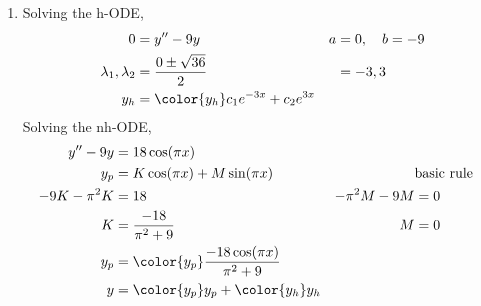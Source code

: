 \begin{enumerate}
    \item Solving the h-ODE,
          \begin{align}
              0                        & = y'' - 9y                               &
              a                        & = 0, \quad b = -9                          \\
              \lambda_{1}, \lambda_{2} & = \frac{0 \pm \sqrt{36}}{2}              &
                                       & = -3, 3                                    \\
              y_{h}                    & = \color{y_h} c_{1}e^{-3x} + c_{2}e^{3x}
          \end{align}
          Solving the nh-ODE,
          \begin{align}
              y'' - 9y       & = 18\cos(\pi x)                                      \\
              y_{p}          & = K \cos(\pi x) + M \sin(\pi x)                    &
                             & \text{basic rule}                                    \\
              -9K -\pi^{2}K  & = 18                                               &
              -\pi^{2}M - 9M & = 0                                                  \\
              K              & = \frac{-18}{\pi ^{2} + 9}                         &
              M              & = 0                                                  \\
              y_{p}          & = \color{y_p} \frac{-18\cos (\pi x)}{\pi ^{2} + 9}   \\
              y              & = {\color{y_p} y_{p}} + {\color{y_h} y_{h}}
          \end{align}


\end{enumerate}
